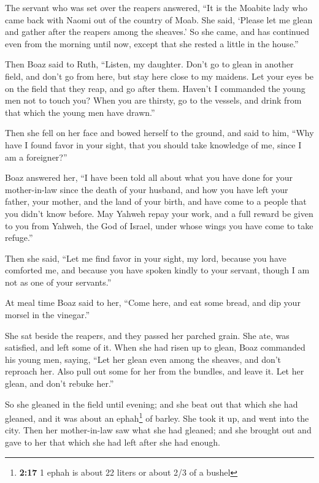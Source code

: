  The servant who was set over the reapers answered, ``It
is the Moabite lady who came back with Naomi out of the country of Moab.
 She said, `Please let me glean and gather after the
reapers among the sheaves.' So she came, and has continued even from the
morning until now, except that she rested a little in the house.''

 Then Boaz said to Ruth, ``Listen, my daughter. Don't go
to glean in another field, and don't go from here, but stay here close
to my maidens.  Let your eyes be on the field that they
reap, and go after them. Haven't I commanded the young men not to touch
you? When you are thirsty, go to the vessels, and drink from that which
the young men have drawn.''

 Then she fell on her face and bowed herself to the
ground, and said to him, ``Why have I found favor in your sight, that
you should take knowledge of me, since I am a foreigner?''

 Boaz answered her, ``I have been told all about what you
have done for your mother-in-law since the death of your husband, and
how you have left your father, your mother, and the land of your birth,
and have come to a people that you didn't know before. 
May Yahweh repay your work, and a full reward be given to you from
Yahweh, the God of Israel, under whose wings you have come to take
refuge.''

 Then she said, ``Let me find favor in your sight, my
lord, because you have comforted me, and because you have spoken kindly
to your servant, though I am not as one of your servants.''

 At meal time Boaz said to her, ``Come here, and eat some
bread, and dip your morsel in the vinegar.''

She sat beside the reapers, and they passed her parched grain. She ate,
was satisfied, and left some of it.  When she had risen
up to glean, Boaz commanded his young men, saying, ``Let her glean even
among the sheaves, and don't reproach her.  Also pull out
some for her from the bundles, and leave it. Let her glean, and don't
rebuke her.''

 So she gleaned in the field until evening; and she beat
out that which she had gleaned, and it was about an ephah\footnote{\textbf{2:17}
  1 ephah is about 22 liters or about 2/3 of a bushel} of barley.
 She took it up, and went into the city. Then her
mother-in-law saw what she had gleaned; and she brought out and gave to
her that which she had left after she had enough.

